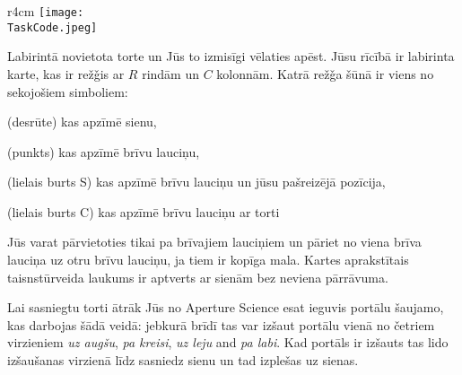 \documentclass{boi2014-lv}
\renewcommand{\TaskCode}{portals}
\newcommand{\constant}[1]{{\tt #1}}
\begin{document}
    \begin{wrapfigure}[4]{r}{4cm}
        \vspace{-24pt}
		\texttt{[image: \\TaskCode.jpeg]}
	\end{wrapfigure}

		Labirintā novietota torte un Jūs to izmisīgi vēlaties apēst. Jūsu rīcībā ir labirinta karte, kas ir rež\v{g}is ar $R$ rindām un $C$ kolonnām. Katrā rež\v{g}a šūnā ir viens no sekojošiem simboliem:
    \begin{description}[itemindent=1pt]
    	\item[\constant{\#}] (desrūte) kas apzīmē sienu, %
        \item[\constant{.}] (punkts) kas apzīmē brīvu lauciņu,%
        \item[\constant{S}] (lielais burts S) kas apzīmē brīvu lauciņu un jūsu pašreizējā pozīcija,%
        \item[\constant{C}] (lielais burts C) kas apzīmē brīvu lauciņu ar torti%
    \end{description}

		Jūs varat pārvietoties tikai pa brīvajiem lauciņiem un pāriet no viena brīva lauciņa uz otru brīvu lauciņu, ja tiem ir kopīga mala. Kartes aprakstītais taisnstūrveida laukums ir aptverts ar sienām bez neviena pārrāvuma.

		Lai sasniegtu torti ātrāk Jūs no Aperture Science\texttrademark{} esat ieguvis portālu šaujamo, kas darbojas šādā veidā: jebkurā brīdī tas var izšaut portālu vienā no četriem virzieniem \emph{uz augšu}, \emph{pa kreisi}, \emph{uz leju} and \emph{pa labi}. Kad portāls ir izšauts tas lido izšaušanas virzienā līdz sasniedz sienu un tad izplešas uz sienas. 
\end{document}
